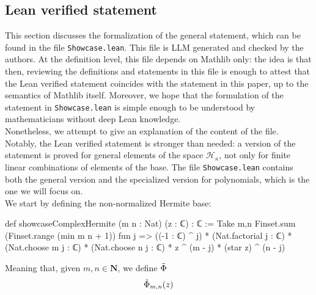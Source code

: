 \documentclass[11pt]{amsart}
\theoremstyle{remark}
\begin{document}
\subsection{Lean verified statement}
This section discusses the formalization of the general statement, which can be found in the file {\scriptsize \texttt{Showcase.lean}}. This file is LLM generated and checked by the authors. At the definition level, this file depends on Mathlib only: the idea is that then, reviewing the definitions and statements in this file is enough to attest that the Lean verified statement coincides with the statement in this paper, up to the semantics of Mathlib itself. Moreover, we hope that the formulation of the statement in {\scriptsize \texttt{Showcase.lean}} is simple enough to be understood by mathematicians without deep Lean knowledge. \\
Nonetheless, we attempt to give an explanation of the content of the file. Notably, the Lean verified statement is stronger than needed: a version of the statement is proved for general elements of the space $\mathcal{H}_\kappa$, not only for finite linear combinations of elements of the base. The file {\scriptsize \texttt{Showcase.lean}} contains both the general version and the specialized version for polynomials, which is the one we will focus on.\\
We start by defining the non-normalized Hermite base: 
\begin{leancode}
    def showcaseComplexHermite (m n : Nat) (z : ℂ) : ℂ :=       Take m,n 
  Finset.sum (Finset.range (min m n + 1)) fun j =>
    ((-1 : ℂ) ^ j) * (Nat.factorial j : ℂ) *
      (Nat.choose m j : ℂ) * (Nat.choose n j : ℂ) *
      z ^ (m - j) * (star z) ^ (n - j)
\end{leancode}     
Meaning that, given $m,n\in \mathbf{N}$, we define $\Tilde{\Phi}$
\begin{equation*}
    \Tilde{\Phi}_{m,n}(z)
\end{equation*}



















\end{document}
